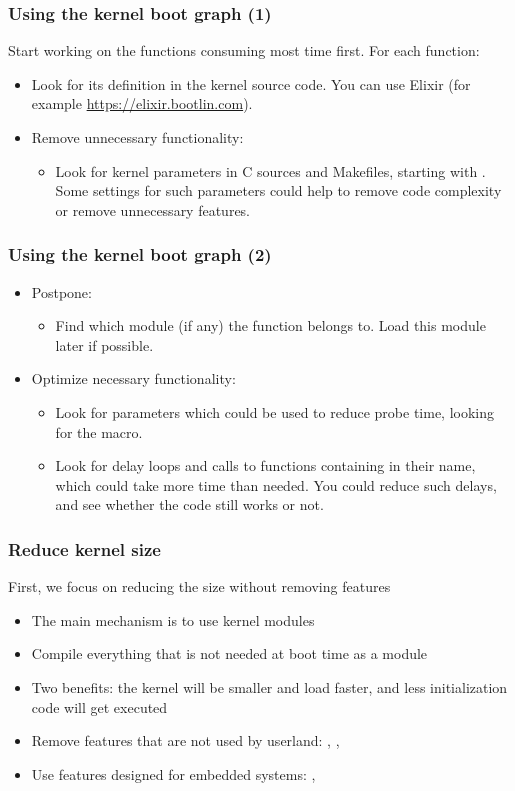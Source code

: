 \begin{frame}
\frametitle{Using the kernel boot graph (1)}
Start working on the functions consuming most time first. For each
function:
\begin{itemize}
\item Look for its definition in the kernel source code. You can use
      Elixir (for example \url{https://elixir.bootlin.com}).
\item Remove unnecessary functionality:
      \begin{itemize}
      \item Look for kernel parameters in C sources and Makefiles, starting
      with . Some settings for such parameters could help
      to remove code complexity or remove unnecessary features.
      \end{itemize}
\end{itemize}
\end{frame}

\begin{frame}
\frametitle{Using the kernel boot graph (2)}
\begin{itemize}
\item Postpone:
      \begin{itemize}
      \item Find which module (if any) the function belongs to.
            Load this module later if possible.
      \end{itemize}
\item Optimize necessary functionality:
      \begin{itemize}
      \item Look for parameters which could be used to reduce probe time,
            looking for the  macro.
      \item Look for delay loops and calls to functions containing
             in their name, which could take more time than
            needed. You could reduce such delays, and see whether the
            code still works or not.
      \end{itemize}
\end{itemize}
\end{frame}

\begin{frame}
\frametitle{Reduce kernel size}
First, we focus on reducing the size without removing features
\begin{itemize}
	\item The main mechanism is to use kernel modules
	\item Compile everything that is not needed at boot time as a
		module
	\item Two benefits: the kernel will be smaller and load faster, and
		less initialization code will get executed
	\item Remove features that are not used by userland:
		, ,
	\item Use features designed for embedded systems:
		, 
\end{itemize}
\end{frame}

